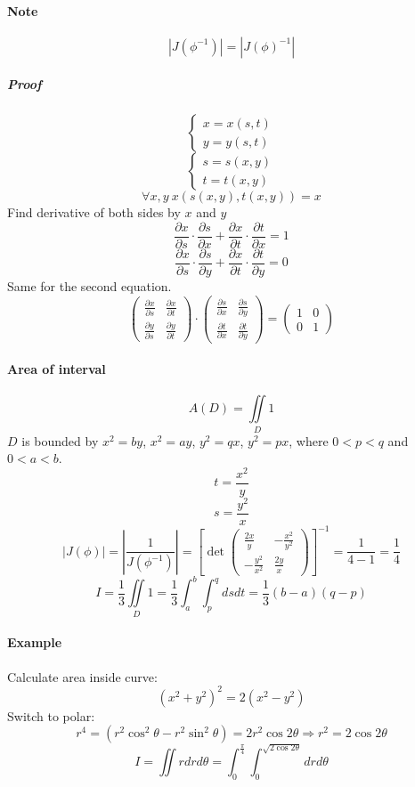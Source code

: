 \paragraph{Note}
$$\left|J(\phi^{-1})\right| = \left| J(\phi)^{-1} \right|$$
\subparagraph{Proof}
$$\begin{cases}
x=x(s,t)\\y=y(s,t)
\end{cases}$$
$$\begin{cases}
s=s(x,y)\\t=t(x,y)
\end{cases}$$
$$\forall x,y \: x(s(x,y),t(x,y)) = x$$
Find derivative of both sides by $x$ and $y$
$$\frac{\partial x}{\partial s} \cdot \frac{\partial s}{\partial x} + \frac{\partial x}{\partial t} \cdot \frac{\partial t}{\partial x} = 1$$
$$\frac{\partial x}{\partial s} \cdot \frac{\partial s}{\partial y} + \frac{\partial x}{\partial t} \cdot \frac{\partial t}{\partial y} = 0$$
Same for the second equation.
$$\begin{pmatrix}\frac{\partial x}{\partial s}&\frac{\partial x}{\partial t}\\\frac{\partial y}{\partial s}&\frac{\partial y}{\partial t}
\end{pmatrix} \cdot \begin{pmatrix}\frac{\partial s}{\partial x}&\frac{\partial s}{\partial y}\\\frac{\partial t}{\partial x}&\frac{\partial t}{\partial y}
\end{pmatrix}=\begin{pmatrix}1&0\\0&1\end{pmatrix}$$
\paragraph{Area of interval}
$$A(D) = \iint\limits_D 1$$
$D$ is bounded by $x^2=by$, $x^2=ay$, $y^2=qx$, $y^2=px$, where $0<p<q$ and $0<a<b$.
$$t=\frac{x^2}{y}$$
$$s=\frac{y^2}{x}$$
$$|J(\phi)| = \left|\frac{1}{J(\phi^{-1})} \right| = \left[\det \begin{pmatrix}\frac{2x}{y}&-\frac{x^2}{y^2}\\-\frac{y^2}{x^2}&\frac{2y}{x}\end{pmatrix}\right]^{-1} = \frac{1}{4-1}=\frac{1}{4}$$
$$I=\frac{1}{3}\iint\limits_{D} 1 = \frac{1}{3}\int_a^b\int_p^q dsdt = \frac{1}{3}(b-a)(q-p)$$
\paragraph{Example}
Calculate area inside curve:
$$(x^2+y^2)^2=2(x^2-y^2)$$
Switch to polar:
$$r^4=(r^2\cos^2 \theta - r^2 \sin^2 \theta) = 2r^2\cos 2\theta \Rightarrow r^2 = 2\cos 2\theta$$
$$I = \iint\limits r dr d\theta = \int_0^{\frac{\pi}{4}} \int_{0}^{\sqrt{2\cos 2\theta}} dr d\theta$$